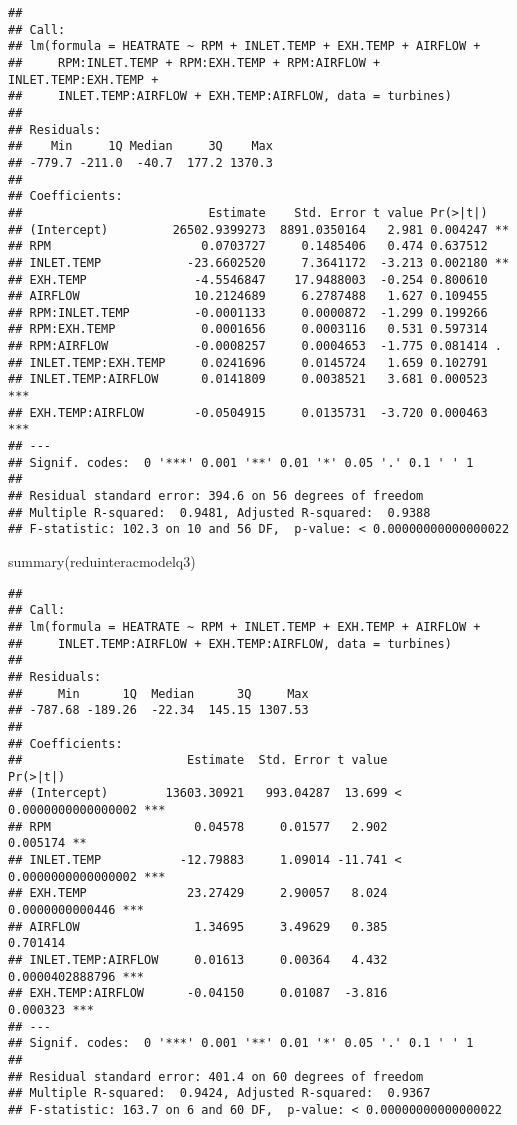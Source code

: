 \documentclass[
]{article}
\newenvironment{Shaded}{\begin{snugshade}}{\end{snugshade}}
\newcommand{\FunctionTok}[1]{\textcolor[rgb]{0.00,0.00,0.00}{#1}}
\newcommand{\NormalTok}[1]{#1}
\begin{document}
\begin{verbatim}
## 
## Call:
## lm(formula = HEATRATE ~ RPM + INLET.TEMP + EXH.TEMP + AIRFLOW + 
##     RPM:INLET.TEMP + RPM:EXH.TEMP + RPM:AIRFLOW + INLET.TEMP:EXH.TEMP + 
##     INLET.TEMP:AIRFLOW + EXH.TEMP:AIRFLOW, data = turbines)
## 
## Residuals:
##    Min     1Q Median     3Q    Max 
## -779.7 -211.0  -40.7  177.2 1370.3 
## 
## Coefficients:
##                          Estimate    Std. Error t value Pr(>|t|)    
## (Intercept)         26502.9399273  8891.0350164   2.981 0.004247 ** 
## RPM                     0.0703727     0.1485406   0.474 0.637512    
## INLET.TEMP            -23.6602520     7.3641172  -3.213 0.002180 ** 
## EXH.TEMP               -4.5546847    17.9488003  -0.254 0.800610    
## AIRFLOW                10.2124689     6.2787488   1.627 0.109455    
## RPM:INLET.TEMP         -0.0001133     0.0000872  -1.299 0.199266    
## RPM:EXH.TEMP            0.0001656     0.0003116   0.531 0.597314    
## RPM:AIRFLOW            -0.0008257     0.0004653  -1.775 0.081414 .  
## INLET.TEMP:EXH.TEMP     0.0241696     0.0145724   1.659 0.102791    
## INLET.TEMP:AIRFLOW      0.0141809     0.0038521   3.681 0.000523 ***
## EXH.TEMP:AIRFLOW       -0.0504915     0.0135731  -3.720 0.000463 ***
## ---
## Signif. codes:  0 '***' 0.001 '**' 0.01 '*' 0.05 '.' 0.1 ' ' 1
## 
## Residual standard error: 394.6 on 56 degrees of freedom
## Multiple R-squared:  0.9481, Adjusted R-squared:  0.9388 
## F-statistic: 102.3 on 10 and 56 DF,  p-value: < 0.00000000000000022
\end{verbatim}

\begin{Shaded}
\begin{Highlighting}[]
\FunctionTok{summary}\NormalTok{(reduinteracmodelq3)}
\end{Highlighting}
\end{Shaded}

\begin{verbatim}
## 
## Call:
## lm(formula = HEATRATE ~ RPM + INLET.TEMP + EXH.TEMP + AIRFLOW + 
##     INLET.TEMP:AIRFLOW + EXH.TEMP:AIRFLOW, data = turbines)
## 
## Residuals:
##     Min      1Q  Median      3Q     Max 
## -787.68 -189.26  -22.34  145.15 1307.53 
## 
## Coefficients:
##                       Estimate  Std. Error t value             Pr(>|t|)    
## (Intercept)        13603.30921   993.04287  13.699 < 0.0000000000000002 ***
## RPM                    0.04578     0.01577   2.902             0.005174 ** 
## INLET.TEMP           -12.79883     1.09014 -11.741 < 0.0000000000000002 ***
## EXH.TEMP              23.27429     2.90057   8.024      0.0000000000446 ***
## AIRFLOW                1.34695     3.49629   0.385             0.701414    
## INLET.TEMP:AIRFLOW     0.01613     0.00364   4.432      0.0000402888796 ***
## EXH.TEMP:AIRFLOW      -0.04150     0.01087  -3.816             0.000323 ***
## ---
## Signif. codes:  0 '***' 0.001 '**' 0.01 '*' 0.05 '.' 0.1 ' ' 1
## 
## Residual standard error: 401.4 on 60 degrees of freedom
## Multiple R-squared:  0.9424, Adjusted R-squared:  0.9367 
## F-statistic: 163.7 on 6 and 60 DF,  p-value: < 0.00000000000000022
\end{verbatim}
\end{document}
